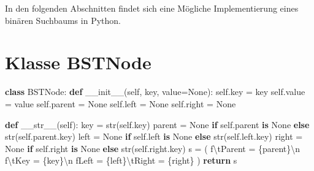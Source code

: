 \documentclass[
  nswissgerman,
  a4paper,
  DIV=11,
  numbers=noendperiod,
  ngerman]{scrreprt}
\newenvironment{Shaded}{\begin{snugshade}}{\end{snugshade}}
\newcommand{\BuiltInTok}[1]{\textcolor[rgb]{0.00,0.23,0.31}{#1}}
\newcommand{\CharTok}[1]{\textcolor[rgb]{0.13,0.47,0.30}{#1}}
\newcommand{\ControlFlowTok}[1]{\textcolor[rgb]{0.00,0.23,0.31}{\textbf{#1}}}
\newcommand{\FunctionTok}[1]{\textcolor[rgb]{0.28,0.35,0.67}{#1}}
\newcommand{\KeywordTok}[1]{\textcolor[rgb]{0.00,0.23,0.31}{\textbf{#1}}}
\newcommand{\NormalTok}[1]{\textcolor[rgb]{0.00,0.23,0.31}{#1}}
\newcommand{\OperatorTok}[1]{\textcolor[rgb]{0.37,0.37,0.37}{#1}}
\newcommand{\SpecialCharTok}[1]{\textcolor[rgb]{0.37,0.37,0.37}{#1}}
\newcommand{\SpecialStringTok}[1]{\textcolor[rgb]{0.13,0.47,0.30}{#1}}
\newcommand{\StringTok}[1]{\textcolor[rgb]{0.13,0.47,0.30}{#1}}
\newcommand{\VariableTok}[1]{\textcolor[rgb]{0.07,0.07,0.07}{#1}}
\begin{document}
In den folgenden Abschnitten findet sich eine Mögliche Implementierung
eines binären Suchbaums in Python.

\section{Klasse BSTNode}\label{klasse-bstnode}

\begin{Shaded}
\begin{Highlighting}[numbers=left,,]
\KeywordTok{class}\NormalTok{ BSTNode:}
    \KeywordTok{def} \FunctionTok{\_\_init\_\_}\NormalTok{(}\VariableTok{self}\NormalTok{, key, value}\OperatorTok{=}\VariableTok{None}\NormalTok{):}
        \VariableTok{self}\NormalTok{.key }\OperatorTok{=}\NormalTok{ key}
        \VariableTok{self}\NormalTok{.value }\OperatorTok{=}\NormalTok{ value}
        \VariableTok{self}\NormalTok{.parent }\OperatorTok{=} \VariableTok{None}
        \VariableTok{self}\NormalTok{.left }\OperatorTok{=} \VariableTok{None}
        \VariableTok{self}\NormalTok{.right }\OperatorTok{=} \VariableTok{None}

    \KeywordTok{def} \FunctionTok{\_\_str\_\_}\NormalTok{(}\VariableTok{self}\NormalTok{):}
\NormalTok{        key }\OperatorTok{=} \BuiltInTok{str}\NormalTok{(}\VariableTok{self}\NormalTok{.key)}
\NormalTok{        parent }\OperatorTok{=} \StringTok{\textquotesingle{}None\textquotesingle{}} \ControlFlowTok{if} \VariableTok{self}\NormalTok{.parent }\KeywordTok{is} \VariableTok{None} \ControlFlowTok{else} \BuiltInTok{str}\NormalTok{(}\VariableTok{self}\NormalTok{.parent.key)}
\NormalTok{        left }\OperatorTok{=} \StringTok{\textquotesingle{}None\textquotesingle{}} \ControlFlowTok{if} \VariableTok{self}\NormalTok{.left }\KeywordTok{is} \VariableTok{None} \ControlFlowTok{else} \BuiltInTok{str}\NormalTok{(}\VariableTok{self}\NormalTok{.left.key)}
\NormalTok{        right }\OperatorTok{=} \StringTok{\textquotesingle{}None\textquotesingle{}} \ControlFlowTok{if} \VariableTok{self}\NormalTok{.right }\KeywordTok{is} \VariableTok{None} \ControlFlowTok{else} \BuiltInTok{str}\NormalTok{(}\VariableTok{self}\NormalTok{.right.key)}
\NormalTok{        s }\OperatorTok{=}\NormalTok{ (}
            \SpecialStringTok{f\textquotesingle{}}\CharTok{\textbackslash{}t}\SpecialStringTok{Parent = }\SpecialCharTok{\{}\NormalTok{parent}\SpecialCharTok{\}}\CharTok{\textbackslash{}n}\SpecialStringTok{\textquotesingle{}}
            \SpecialStringTok{f\textquotesingle{}}\CharTok{\textbackslash{}t}\SpecialStringTok{Key = }\SpecialCharTok{\{}\NormalTok{key}\SpecialCharTok{\}}\CharTok{\textbackslash{}n}\SpecialStringTok{\textquotesingle{}}
            \SpecialStringTok{f\textquotesingle{}Left = }\SpecialCharTok{\{}\NormalTok{left}\SpecialCharTok{\}}\CharTok{\textbackslash{}t}\SpecialStringTok{Right = }\SpecialCharTok{\{}\NormalTok{right}\SpecialCharTok{\}}\SpecialStringTok{\textquotesingle{}}
\NormalTok{        )}
        \ControlFlowTok{return}\NormalTok{ s}
\end{Highlighting}
\end{Shaded}
\end{document}
